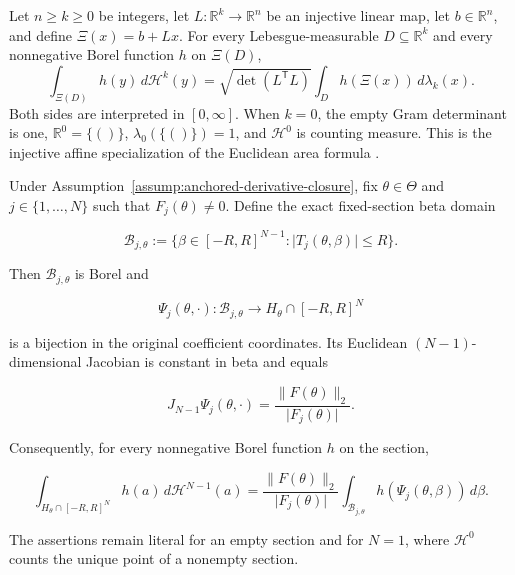 \begin{theorem}
\label{thm:injective-affine-area-formula}
Let \(n\geq k\geq0\) be integers, let \(L:\mathbb R^k\to\mathbb R^n\) be an injective linear map, let
\(b\in\mathbb R^n\), and define \(\Xi(x)=b+Lx\). For every Lebesgue-measurable
\(D\subseteq\mathbb R^k\) and every nonnegative Borel function \(h\) on \(\Xi(D)\),
\begin{equation}
\label{eq:injective-affine-area-formula}
\int_{\Xi(D)}h(y)\,d\mathcal H^k(y)
=
\sqrt{\det(L^{\mathsf T}L)}
\int_D h(\Xi(x))\,d\lambda_k(x).
\end{equation}
Both sides are interpreted in \([0,\infty]\). When \(k=0\), the empty Gram determinant is one,
\(\mathbb R^0=\{()\}\), \(\lambda_0(\{()\})=1\), and \(\mathcal H^0\) is counting measure.
This is the injective affine specialization of the Euclidean area formula
\citep[Section~3.2.3]{federer1969gmt}.
\end{theorem}

\begin{lemma}
\label{lem:step-004-s2-section-parametrization}

Under Assumption~\ref{assump:anchored-derivative-closure}, fix
\(\theta\in\Theta\) and \(j\in\{1,\ldots,N\}\) such that \(F_j(\theta)\neq0\). Define the exact
fixed-section beta domain

\begin{equation}
\label{eq:appendix-display-107}
\mathcal B_{j,\theta}
:=\{\beta\in[-R,R]^{N-1}:
\lvert T_j(\theta,\beta)\rvert\leq R\}.
\end{equation}

Then \(\mathcal B_{j,\theta}\) is Borel and

\begin{equation}
\label{eq:appendix-display-108}
\Psi_j(\theta,\cdot):\mathcal B_{j,\theta}
\longrightarrow H_\theta\cap[-R,R]^N
\end{equation}

is a bijection in the original coefficient coordinates. Its Euclidean
\((N-1)\)-dimensional Jacobian is constant in beta and equals

\begin{equation}
\label{eq:appendix-display-109}
J_{N-1}\Psi_j(\theta,\cdot)
=\frac{\lVert F(\theta)\rVert_2}{\lvert F_j(\theta)\rvert}.
\end{equation}

Consequently, for every nonnegative Borel function \(h\) on the section,

\begin{equation}
\label{eq:appendix-display-110}
\int_{H_\theta\cap[-R,R]^N}h(a)\,d\mathcal H^{N-1}(a)
=
\frac{\lVert F(\theta)\rVert_2}{\lvert F_j(\theta)\rvert}
\int_{\mathcal B_{j,\theta}}
h(\Psi_j(\theta,\beta))\,d\beta.
\end{equation}

The assertions remain literal for an empty section and for \(N=1\), where \(\mathcal H^0\) counts the
unique point of a nonempty section.


\end{lemma}

